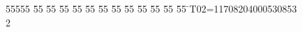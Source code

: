 %
%
\begin{tabbing}
55555 \= 55 \= 55 \= 55 \= 55 \= 55 \= 55 \= 55 \= 55 \= 55 \= 55 \= 55 \= 55 \= \>T02=11708204000530853\\[0pt]
2\>\end{tabbing}
